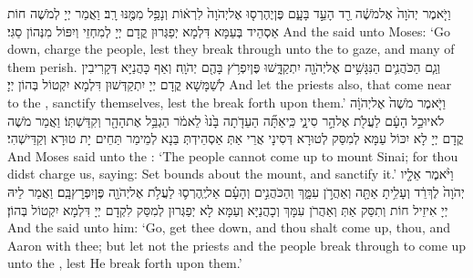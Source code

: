 {וַיֹּ֤אמֶר יְהֹוָה֙ אֶל\maqqaf מֹשֶׁ֔ה רֵ֖ד הָעֵ֣ד בָּעָ֑ם פֶּן\maqqaf יֶהֶרְס֤וּ אֶל\maqqaf יְהֹוָה֙ לִרְא֔וֹת וְנָפַ֥ל מִמֶּ֖נּוּ רָֽב׃}
{וַאֲמַר יְיָ לְמֹשֶׁה חוֹת אַסְהֵיד בְּעַמָּא דִּלְמָא יְפַגְּרוּן קֳדָם יְיָ לְמִחְזֵי וְיִפּוֹל מִנְּהוֹן סַגִּי׃}
{And the \lord\space said unto Moses: ‘Go down, charge the people, lest they break through unto the \lord\space to gaze, and many of them perish.}{}
{וְגַ֧ם הַכֹּהֲנִ֛ים הַנִּגָּשִׁ֥ים אֶל\maqqaf יְהֹוָ֖ה יִתְקַדָּ֑שׁוּ פֶּן\maqqaf יִפְרֹ֥ץ בָּהֶ֖ם יְהֹוָֽה׃}
{וְאַף כָּהֲנַיָּא דְּקָרִיבִין לְשַׁמָּשָׁא קֳדָם יְיָ יִתְקַדְּשׁוּן דִּלְמָא יִקְטוֹל בְּהוֹן יְיָ׃}
{And let the priests also, that come near to the \lord, sanctify themselves, lest the \lord\space break forth upon them.’}{}
{וַיֹּ֤אמֶר מֹשֶׁה֙ אֶל\maqqaf יְהֹוָ֔ה לֹא\maqqaf יוּכַ֣ל הָעָ֔ם לַעֲלֹ֖ת אֶל\maqqaf הַ֣ר סִינָ֑י כִּֽי\maqqaf אַתָּ֞ה הַעֵדֹ֤תָה בָּ֙נוּ֙ לֵאמֹ֔ר הַגְבֵּ֥ל אֶת\maqqaf הָהָ֖ר וְקִדַּשְׁתּֽוֹ׃}
{וַאֲמַר מֹשֶׁה קֳדָם יְיָ לָא יִכּוֹל עַמָּא לְמִסַּק לְטוּרָא דְּסִינָי אֲרֵי אַתְּ אַסְהֵידְתְּ בַּנָא לְמֵימַר תַּחֵים יָת טוּרָא וְקַדֵּישְׁהִי׃}
{And Moses said unto the \lord: ‘The people cannot come up to mount Sinai; for thou didst charge us, saying: Set bounds about the mount, and sanctify it.’}{}
{וַיֹּ֨אמֶר אֵלָ֤יו יְהֹוָה֙ לֶךְ\maqqaf רֵ֔ד וְעָלִ֥יתָ אַתָּ֖ה וְאַהֲרֹ֣ן עִמָּ֑ךְ וְהַכֹּהֲנִ֣ים וְהָעָ֗ם אַל\maqqaf יֶֽהֶרְס֛וּ לַעֲלֹ֥ת אֶל\maqqaf יְהֹוָ֖ה פֶּן\maqqaf יִפְרׇץ\maqqaf בָּֽם׃}
{וַאֲמַר לֵיהּ יְיָ אִיזֵיל חוֹת וְתִסַּק אַתְּ וְאַהֲרֹן עִמָּךְ וְכָהֲנַיָּא וְעַמָּא לָא יְפַגְּרוּן לְמִסַּק לִקְדָם יְיָ דִּלְמָא יִקְטוֹל בְּהוֹן׃}
{And the \lord\space said unto him: ‘Go, get thee down, and thou shalt come up, thou, and Aaron with thee; but let not the priests and the people break through to come up unto the \lord, lest He break forth upon them.’}{}
